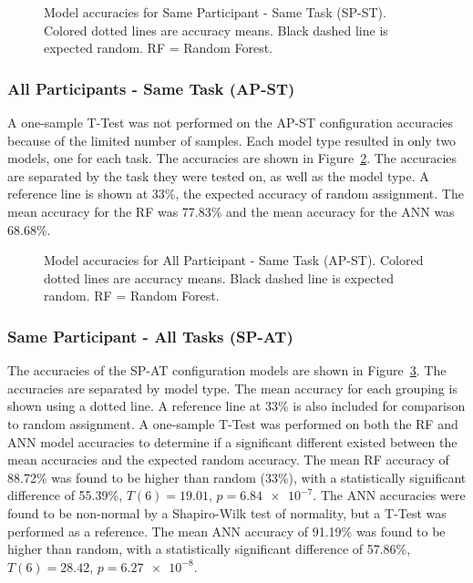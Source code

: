 \documentclass[11pt]{article}
\begin{document}
		\begin{figure}
		\centering
		\caption[Same Participant - Same Task (SP-ST) Model Accuracies]{ Model accuracies for Same Participant - Same Task (SP-ST). Colored dotted lines are accuracy means. Black dashed line is expected random. RF = Random Forest. }
		\label{fig:sp-st}
		\end{figure} 
		
		\subsubsection{All Participants - Same Task (AP-ST)}
		A one-sample T-Test was not performed on the AP-ST configuration accuracies because of the limited number of samples. Each model type resulted in only two models, one for each task. The accuracies are shown in Figure~\ref{fig:ap-st}. The accuracies are separated by the task they were tested on, as well as the model type. A reference line is shown at 33\%, the expected accuracy of random assignment. The mean accuracy for the RF was 77.83\% and the mean accuracy for the ANN was 68.68\%.
		\begin{figure}
		\centering
		\caption[All Participant - Same Task (AP-ST) Model Accuracies]{ Model accuracies for All Participant - Same Task (AP-ST). Colored dotted lines are accuracy means. Black dashed line is expected random. RF = Random Forest. }
		\label{fig:ap-st}
		\end{figure} 
		
		\subsubsection{Same Participant - All Tasks (SP-AT)}
		The accuracies of the SP-AT configuration models are shown in Figure~\ref{fig:sp-at}. The accuracies are separated by model type. The mean accuracy for each grouping is shown using a dotted line. A reference line at 33\% is also included for comparison to random assignment. A one-sample T-Test was performed on both the RF and ANN model accuracies to determine if a significant different existed between the mean accuracies and the expected random accuracy. The mean RF accuracy of 88.72\% was found to be higher than random (33\%), with a statistically significant difference of 55.39\%, \(T(6) = 19.01\), \(p = \num{6.84e-7}\). The ANN accuracies were found to be non-normal by a Shapiro-Wilk test of normality, but a T-Test was performed as a reference. The mean ANN accuracy of 91.19\% was found to be higher than random, with a statistically significant difference of 57.86\%, \(T(6) = 28.42\), \(p = \num{6.27e-8}\).
		\begin{figure}
		\centering
		\caption{}
		\label{fig:sp-at}
		\end{figure} 
		
\end{document}
